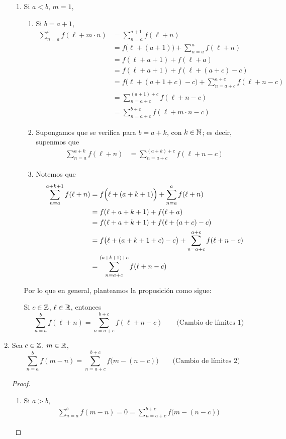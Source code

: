 \begin{enumerate}[label=\alph*)]
\begin{enumerate}[label=\Roman*)]
    \item Si $a<b$, $m=1$,
    \begin{enumerate}[label=\roman*)]
      \item Si $b=a+1$,
      \begin{align*}
        \sum_{n=a}^b f(\ell+m\cdot n) &=\sum_{n=a}^{a+1} f(\ell+n)\\
        &= f\bigl(\ell+ (a+1)\bigr) + \sum_{n=a}^{a} f(\ell+ n)\\
        &= f(\ell+a+1) + f(\ell+a)\\
        &= f(\ell+a+1) + f(\ell +(a+c)-c)\\
        &= f\bigl(\ell+(a+1+c)-c\bigr) + \sum_{n=a+c}^{a+c} f(\ell+ n-c)\\
        &= \sum_{n=a+c}^{(a+1)+c} f(\ell+n-c)\\
        &= \sum_{n=a+c}^{b+c} f(\ell+m\cdot n-c)
      \end{align*}

      \item Supongamos que se verifica para $b=a+k$, con $k\in \mathbb{N}$; es decir, supenmos que
      \begin{align*}
        \sum_{n=a}^{a+k} f(\ell+n) &= \sum_{n=a+c}^{(a+k)+c} f(\ell+n-c)
      \end{align*}

      \item Notemos que
      \begin{align*}
        \sum_{n=a}^{a+k+1} f(\ell+n) &= f\Bigl(\ell+ (a+k+1)\Bigr) + \sum_{n=a}^{a} f(\ell+ n)\\
        &= f(\ell+a+k+1) + f(\ell+a)\\
        &= f(\ell+a+k+1) + f(\ell +(a+c)-c)\\
        &= f\bigl(\ell+(a+k+1+c)-c\bigr) + \sum_{n=a+c}^{a+c} f(\ell+ n-c)\\
        &= \sum_{n=a+c}^{(a+k+1)+c} f(\ell+n-c)
      \end{align*}
    \end{enumerate}


    Por lo que en general, planteamos la proposición como sigue:

    Si $c\in \mathbb{Z}$, $\ell \in \mathbb{R}$, entonces \[\sum_{n=a}^b f(\ell+n) = \sum_{n=a+c}^{b+c} f(\ell+n-c) \qquad \text{(Cambio de límites 1)}\]
    
  \end{enumerate}

  \item Sea $c\in \mathbb{Z}$, $m\in \mathbb{R}$, \[\sum_{n=a}^b f(m-n) = \sum_{n=a+c}^{b+c} f\bigl(m-(n-c)\bigr) \qquad \text{(Cambio de límites 2)}\]
  \begin{proof}\leavevmode
    \begin{enumerate}[label=\roman*)]
    \item Si $a>b$,
    \begin{align*}
      \sum_{n=a}^b f(m-n) = 0 = \sum_{n=a+c}^{b+c} f\bigl(m-(n-c)\bigr)
    \end{align*}


\end{enumerate}
\end{proof}
\end{enumerate}
